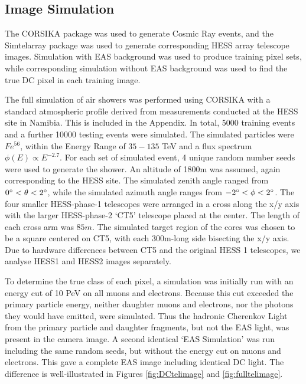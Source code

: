 \documentclass[11pt]{article}
\begin{document}
\subsection{Image Simulation}
The CORSIKA package \cite{Heck98} was used to generate Cosmic Ray events, and the Sim\textunderscore telarray package  \cite{Bernlohr08} was used to generate corresponding HESS array telescope images.  Simulation with EAS background was used to produce training pixel sets, while corresponding simulation without EAS background was used to find the true DC pixel in each training image.

The full simulation of air showers was performed using CORSIKA with a standard atmospheric profile derived from measurements conducted at the HESS site in Namibia. This is included in the Appendix. In total, 5000 training events and a further 10000 testing events were simulated. The simulated particles were $Fe^{56}$, within the Energy Range of $35-135$ TeV and a flux spectrum $\phi(E) \propto E^{-2.7}$. For each set of simulated event, 4 unique random number seeds were used to generate the shower. An altitude of 1800m was assumed, again corresponding to the HESS site. The simulated zenith angle ranged from $0\degree < \theta < 2 \degree$, while the simulated azimuth angle ranges from $-2\degree < \phi < 2 \degree$. The four smaller HESS-phase-1 telescopes were arranged in a cross along the x/y axis with the larger HESS-phase-2 \textquoteleft CT5' telescope placed at the center. The length of each cross arm was $85m$. The simulated target region of the cores was chosen to be a square centered on CT5, with each 300m-long side bisecting the x/y axis. Due to hardware differences between CT5 and the original HESS 1 telescopes, we analyse HESS1 and HESS2 images separately. 

To determine the true class of each pixel, a simulation was initially run with an energy cut of 10 PeV on all muons and electrons. Because this cut exceeded the primary particle energy, neither daughter muons and electrons, nor the photons they would have emitted, were simulated. Thus the hadronic Cherenkov Light from the primary particle and daughter fragments, but not the EAS light, was present in the camera image. A second identical \textquoteleft EAS Simulation' was run including the same random seeds, but without the energy cut on muons and electrons. This gave a complete EAS image including identical DC light. The difference is well-illustrated in Figures \ref{fig:DCtelimage} and \ref{fig:fulltelimage}.
\end{document}
